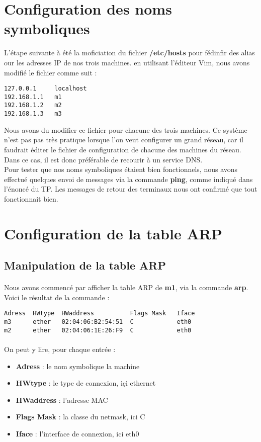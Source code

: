 \documentclass{article}
\begin{document}
\section{Configuration des noms symboliques}

L'étape suivante à été la moficiation du fichier \textbf{/etc/hosts} pour fédinfir des alias our les adresses IP de nos trois machines. en utilisant l'éditeur Vim, nous avons modifié le fichier comme suit :
\begin{verbatim}
127.0.0.1     localhost
192.168.1.1   m1
192.168.1.2   m2
192.168.1.3   m3
\end{verbatim}
Nous avons du modifier ce fichier pour chacune des trois machines. Ce système n'est pas pas très pratique lorsque l'on veut configurer un grand réseau, car il faudrait éditer le fichier de configuration de chacune des machines du réseau. Dans ce cas, il est donc préférable de recourir à un service DNS. \\

Pour tester que nos noms symboliques étaient bien fonctionnels, nous avons effectué quelques envoi de messages via la commande \textbf{ping}, comme indiqué dans l'énoncé du TP. Les messages de retour des terminaux nous ont confirmé que tout fonctionnait bien. \newpage

\section{Configuration de la table ARP}

\subsection{Manipulation de la table ARP}

\paragraph{}{
Nous avons commencé par afficher la table ARP de \textbf{m1}, via la commande \textbf{arp}. Voici le résultat de la commande :
\begin{verbatim}
Adress  HWtype  HWaddress          Flags Mask   Iface
m3      ether   02:04:06:B2:54:51  C            eth0
m2      ether   02:04:06:1E:26:F9  C            eth0
\end{verbatim}}
\paragraph{}{
On peut y lire, pour chaque entrée :
\begin{itemize}
\item \textbf{Adress} : le nom symbolique la machine
\item \textbf{HWtype} : le type de connexion, içi ethernet
\item \textbf{HWaddress} : l'adresse MAC
\item \textbf{Flags Mask} : la classe du netmask, ici C
\item \textbf{Iface} : l'interface de connexion, ici eth0
\end{itemize}}
\end{document}
